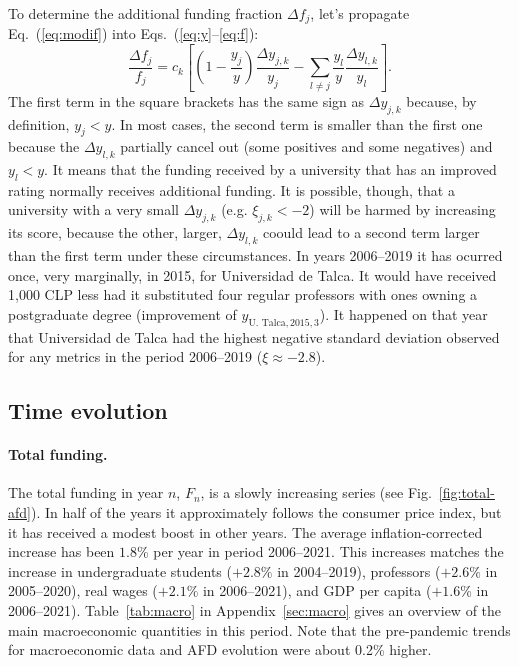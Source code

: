 \documentclass[twocolumn]{article}
\def\eqref#1{Eq.~(\ref{eq:#1})}
\def\eqsref#1#2{Eqs.~(\ref{eq:#1}--\ref{eq:#2})}
\begin{document}
To determine the additional funding fraction $\Delta f_j$, let's propagate 
\eqref{modif} into \eqsref{y}{f}:
\begin{equation}
    \frac{\Delta f_j}{f_j} = c_k \left[
                     \left(1 - \frac{y_{j}}y\right)\frac{\Delta y_{j,k}}{y_{j}}
                    - \sum_{l \ne j} \frac{y_l}y \frac{\Delta y_{l,k}}{y_l}
                 \right].
\end{equation}
The first term in the square brackets has the same sign as $\Delta y_{j,k}$ because, by definition, $y_j < y$.  In most cases, the second term is smaller than the first one because the $\Delta y_{l,k}$ partially cancel out (some positives and some negatives) and $y_l < y$. It means that the funding received by a university that has an improved rating normally receives additional funding.  It is possible, though, that a university with a very small $\Delta y_{j,k}$ (e.g. $\xi_{j,k} < -2$) will be harmed by increasing its score, because the other, larger, $\Delta y_{l,k}$ coould lead to a second term larger than the first term under these circumstances.  In years 2006--2019 it has ocurred once, very marginally, in 2015, for Universidad de Talca.  It would have received 1,000 CLP less had it substituted four regular professors with ones owning a postgraduate degree (improvement of $y_{\text{U. Talca}, 2015, 3}$).  It happened on that year that Universidad de Talca had the highest negative standard deviation observed for any metrics in the period 2006--2019 ($\xi \approx -2.8$). 

\subsection{Time evolution}

\paragraph{Total funding.}
The total funding in year $n$, $F_{n}$, is a slowly increasing series (see Fig.~\ref{fig:total-afd}). In half of the years it approximately follows the consumer price index, but it has received a modest boost in other years.  The average inflation-corrected increase has been $1.8$\% per year in period 2006--2021. This increases matches the increase in undergraduate students ($+2.8\%$ in 2004--2019), professors ($+2.6\%$ in 2005--2020), real wages ($+2.1\%$ in 2006--2021), and GDP per capita ($+1.6$\% in 2006--2021). Table~\ref{tab:macro} in Appendix~\ref{sec:macro} gives an overview of the main macroeconomic quantities in this period. Note that the pre-pandemic trends for macroeconomic data and AFD evolution were about 0.2\% higher. 
 
\end{document}
